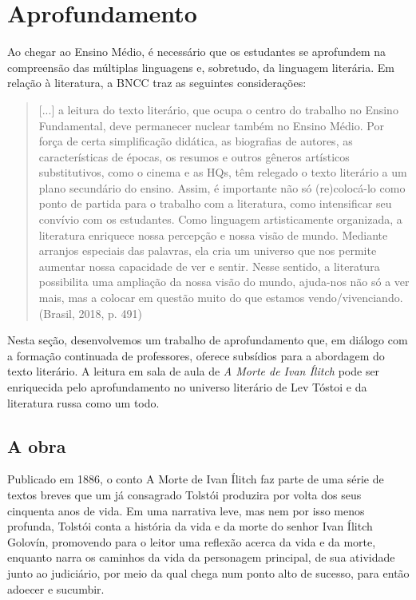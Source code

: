 \documentclass{extarticle}
\begin{document}
\section{Aprofundamento}

Ao chegar ao Ensino Médio, é necessário que os estudantes se aprofundem
na compreensão das múltiplas linguagens e, sobretudo, da linguagem
literária. Em relação à literatura, a BNCC traz as seguintes
considerações:

\begin{quote}
{[}...{]} a leitura do texto literário, que ocupa o centro do trabalho
no Ensino Fundamental, deve permanecer nuclear também no Ensino Médio.
Por força de certa simplificação didática, as biografias de autores, as
características de épocas, os resumos e outros gêneros artísticos
substitutivos, como o cinema e as HQs, têm relegado o texto literário a
um plano secundário do ensino. Assim, é importante não só (re)colocá-lo
como ponto de partida para o trabalho com a literatura, como
intensificar seu convívio com os estudantes. Como linguagem
artisticamente organizada, a literatura enriquece nossa percepção e
nossa visão de mundo. Mediante arranjos especiais das palavras, ela cria
um universo que nos permite aumentar nossa capacidade de ver e sentir.
Nesse sentido, a literatura possibilita uma ampliação da nossa visão do
mundo, ajuda-nos não só a ver mais, mas a colocar em questão muito do
que estamos vendo/vivenciando. (Brasil, 2018, p. 491)
\end{quote}

Nesta seção, desenvolvemos um trabalho de aprofundamento que, em diálogo
com a formação continuada de professores, oferece subsídios para a
abordagem do texto literário. A leitura em sala de aula de \emph{A Morte
de Ivan Ílitch} pode ser enriquecida pelo aprofundamento no universo
literário de Lev Tóstoi e da literatura russa como um todo.

\subsection{A obra}

Publicado em 1886, o conto A Morte de Ivan Ílitch faz parte de uma série
de textos breves que um já consagrado Tolstói produzira por volta dos
seus cinquenta anos de vida. Em uma narrativa leve, mas nem por isso
menos profunda, Tolstói conta a história da vida e da morte do senhor
Ivan Ílitch Golovín, promovendo para o leitor uma reflexão acerca da
vida e da morte, enquanto narra os caminhos da vida da personagem
principal, de sua atividade junto ao judiciário, por meio da qual chega
num ponto alto de sucesso, para então adoecer e sucumbir.
\end{document}
